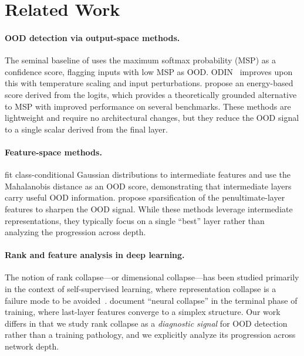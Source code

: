 \documentclass{article}
\begin{document}
\section{Related Work}
\label{sec:related}

\paragraph{OOD detection via output-space methods.}
The seminal baseline of \citet{hendrycks2017baseline} uses the maximum softmax probability (MSP) as a confidence score, flagging inputs with low MSP as OOD. ODIN~\citep{liang2018enhancing} improves upon this with temperature scaling and input perturbations. \citet{liu2020energy} propose an energy-based score derived from the logits, which provides a theoretically grounded alternative to MSP with improved performance on several benchmarks. These methods are lightweight and require no architectural changes, but they reduce the OOD signal to a single scalar derived from the final layer.

\paragraph{Feature-space methods.}
\citet{lee2018simple} fit class-conditional Gaussian distributions to intermediate features and use the Mahalanobis distance as an OOD score, demonstrating that intermediate layers carry useful OOD information. \citet{sun2022dice} propose sparsification of the penultimate-layer features to sharpen the OOD signal. While these methods leverage intermediate representations, they typically focus on a single ``best'' layer rather than analyzing the progression across depth.

\paragraph{Rank and feature analysis in deep learning.}
The notion of rank collapse---or dimensional collapse---has been studied primarily in the context of self-supervised learning, where representation collapse is a failure mode to be avoided~\citep{jing2022understanding,hua2021feature}. \citet{papyan2020prevalence} document ``neural collapse'' in the terminal phase of training, where last-layer features converge to a simplex structure. Our work differs in that we study rank collapse as a \emph{diagnostic signal} for OOD detection rather than a training pathology, and we explicitly analyze its progression across network depth.
\end{document}
